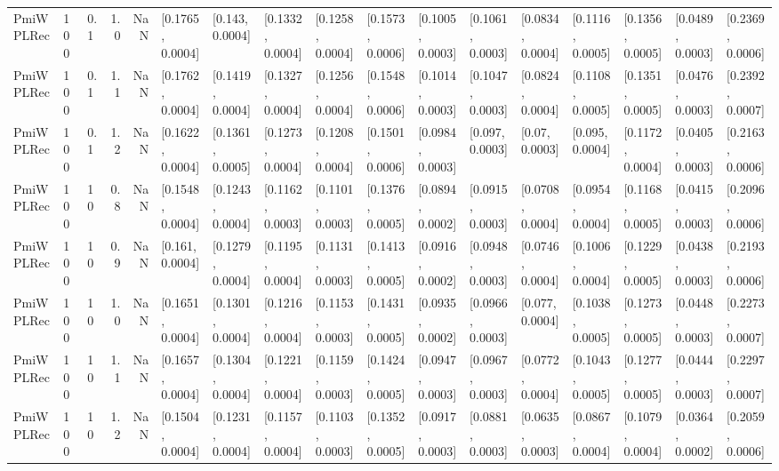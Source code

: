 \begin{tabular}{lllrrllllllllllll}
 PmiWPLRec &  100 &   0.1 &   1.0 &   NaN &  [0.1765, 0.0004] &   [0.143, 0.0004] &  [0.1332, 0.0004] &  [0.1258, 0.0004] &  [0.1573, 0.0006] &  [0.1005, 0.0003] &  [0.1061, 0.0003] &  [0.0834, 0.0004] &  [0.1116, 0.0005] &  [0.1356, 0.0005] &  [0.0489, 0.0003] &  [0.2369, 0.0006] \\
 PmiWPLRec &  100 &   0.1 &   1.1 &   NaN &  [0.1762, 0.0004] &  [0.1419, 0.0004] &  [0.1327, 0.0004] &  [0.1256, 0.0004] &  [0.1548, 0.0006] &  [0.1014, 0.0003] &  [0.1047, 0.0003] &  [0.0824, 0.0004] &  [0.1108, 0.0005] &  [0.1351, 0.0005] &  [0.0476, 0.0003] &  [0.2392, 0.0007] \\
 PmiWPLRec &  100 &   0.1 &   1.2 &   NaN &  [0.1622, 0.0004] &  [0.1361, 0.0005] &  [0.1273, 0.0004] &  [0.1208, 0.0004] &  [0.1501, 0.0006] &  [0.0984, 0.0003] &   [0.097, 0.0003] &    [0.07, 0.0003] &   [0.095, 0.0004] &  [0.1172, 0.0004] &  [0.0405, 0.0003] &  [0.2163, 0.0006] \\
 PmiWPLRec &  100 &    10 &   0.8 &   NaN &  [0.1548, 0.0004] &  [0.1243, 0.0004] &  [0.1162, 0.0003] &  [0.1101, 0.0003] &  [0.1376, 0.0005] &  [0.0894, 0.0002] &  [0.0915, 0.0003] &  [0.0708, 0.0004] &  [0.0954, 0.0004] &  [0.1168, 0.0005] &  [0.0415, 0.0003] &  [0.2096, 0.0006] \\
 PmiWPLRec &  100 &    10 &   0.9 &   NaN &   [0.161, 0.0004] &  [0.1279, 0.0004] &  [0.1195, 0.0004] &  [0.1131, 0.0003] &  [0.1413, 0.0005] &  [0.0916, 0.0002] &  [0.0948, 0.0003] &  [0.0746, 0.0004] &  [0.1006, 0.0004] &  [0.1229, 0.0005] &  [0.0438, 0.0003] &  [0.2193, 0.0006] \\
 PmiWPLRec &  100 &    10 &   1.0 &   NaN &  [0.1651, 0.0004] &  [0.1301, 0.0004] &  [0.1216, 0.0004] &  [0.1153, 0.0003] &  [0.1431, 0.0005] &  [0.0935, 0.0002] &  [0.0966, 0.0003] &   [0.077, 0.0004] &  [0.1038, 0.0005] &  [0.1273, 0.0005] &  [0.0448, 0.0003] &  [0.2273, 0.0007] \\
 PmiWPLRec &  100 &    10 &   1.1 &   NaN &  [0.1657, 0.0004] &  [0.1304, 0.0004] &  [0.1221, 0.0004] &  [0.1159, 0.0003] &  [0.1424, 0.0005] &  [0.0947, 0.0003] &  [0.0967, 0.0003] &  [0.0772, 0.0004] &  [0.1043, 0.0005] &  [0.1277, 0.0005] &  [0.0444, 0.0003] &  [0.2297, 0.0007] \\
 PmiWPLRec &  100 &    10 &   1.2 &   NaN &  [0.1504, 0.0004] &  [0.1231, 0.0004] &  [0.1157, 0.0004] &  [0.1103, 0.0003] &  [0.1352, 0.0005] &  [0.0917, 0.0003] &  [0.0881, 0.0003] &  [0.0635, 0.0003] &  [0.0867, 0.0004] &  [0.1079, 0.0004] &  [0.0364, 0.0002] &  [0.2059, 0.0006] \\

\end{tabular}
